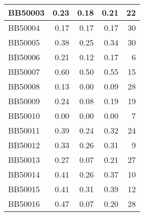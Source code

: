 \begin{longtable}{|l|r|r|r||r|}
	\hline
	BB50003 & \cellcolor[rgb]{ .988,  1,  .992}0.23 & \cellcolor[rgb]{ .384,  .745,  .478}0.18 & \cellcolor[rgb]{ .808,  .922,  .839}0.21 & \cellcolor[rgb]{ .98,  .569,  .576}22 \\
	\hline
	BB50004 & \cellcolor[rgb]{ .988,  1,  .992}0.17 & \cellcolor[rgb]{ .988,  1,  .992}0.17 & \cellcolor[rgb]{ .988,  1,  .992}0.17 & \cellcolor[rgb]{ .973,  .412,  .42}30 \\
	\hline
	BB50005 & \cellcolor[rgb]{ .988,  1,  .992}0.38 & \cellcolor[rgb]{ .384,  .745,  .478}0.25 & \cellcolor[rgb]{ .824,  .929,  .855}0.34 & \cellcolor[rgb]{ .973,  .412,  .42}30 \\
	\hline
	BB50006 & \cellcolor[rgb]{ .988,  1,  .992}0.21 & \cellcolor[rgb]{ .384,  .745,  .478}0.12 & \cellcolor[rgb]{ .725,  .886,  .769}0.17 & \cellcolor[rgb]{ .988,  .875,  .886}6 \\
	\hline
	BB50007 & \cellcolor[rgb]{ .988,  1,  .992}0.60 & \cellcolor[rgb]{ .384,  .745,  .478}0.50 & \cellcolor[rgb]{ .682,  .871,  .733}0.55 & \cellcolor[rgb]{ .98,  .702,  .71}15 \\
	\hline
	BB50008 & \cellcolor[rgb]{ .988,  1,  .992}0.13 & \cellcolor[rgb]{ .384,  .745,  .478}0.00 & \cellcolor[rgb]{ .808,  .922,  .839}0.09 & \cellcolor[rgb]{ .976,  .451,  .459}28 \\
	\hline
	BB50009 & \cellcolor[rgb]{ .988,  1,  .992}0.24 & \cellcolor[rgb]{ .384,  .745,  .478}0.08 & \cellcolor[rgb]{ .788,  .914,  .82}0.19 & \cellcolor[rgb]{ .98,  .624,  .635}19 \\
	\hline
	BB50010 & \cellcolor[rgb]{ .988,  1,  .992}0.00 & \cellcolor[rgb]{ .988,  1,  .992}0.00 & \cellcolor[rgb]{ .988,  1,  .992}0.00 & \cellcolor[rgb]{ .988,  .855,  .867}7 \\
	\hline
	BB50011 & \cellcolor[rgb]{ .988,  1,  .992}0.39 & \cellcolor[rgb]{ .384,  .745,  .478}0.24 & \cellcolor[rgb]{ .706,  .878,  .749}0.32 & \cellcolor[rgb]{ .976,  .529,  .537}24 \\
	\hline
	BB50012 & \cellcolor[rgb]{ .988,  1,  .992}0.33 & \cellcolor[rgb]{ .384,  .745,  .478}0.26 & \cellcolor[rgb]{ .831,  .933,  .859}0.31 & \cellcolor[rgb]{ .984,  .816,  .827}9 \\
	\hline
	BB50013 & \cellcolor[rgb]{ .988,  1,  .992}0.27 & \cellcolor[rgb]{ .384,  .745,  .478}0.07 & \cellcolor[rgb]{ .816,  .925,  .843}0.21 & \cellcolor[rgb]{ .976,  .471,  .478}27 \\
	\hline
	BB50014 & \cellcolor[rgb]{ .988,  1,  .992}0.41 & \cellcolor[rgb]{ .384,  .745,  .478}0.26 & \cellcolor[rgb]{ .835,  .933,  .863}0.37 & \cellcolor[rgb]{ .984,  .796,  .808}10 \\
	\hline
	BB50015 & \cellcolor[rgb]{ .988,  1,  .992}0.41 & \cellcolor[rgb]{ .384,  .745,  .478}0.31 & \cellcolor[rgb]{ .851,  .941,  .875}0.39 & \cellcolor[rgb]{ .984,  .761,  .769}12 \\
	\hline
	BB50016 & \cellcolor[rgb]{ .988,  1,  .992}0.47 & \cellcolor[rgb]{ .384,  .745,  .478}0.07 & \cellcolor[rgb]{ .584,  .827,  .647}0.20 & \cellcolor[rgb]{ .976,  .451,  .459}28 \\
	\hline
	
\end{longtable}%



